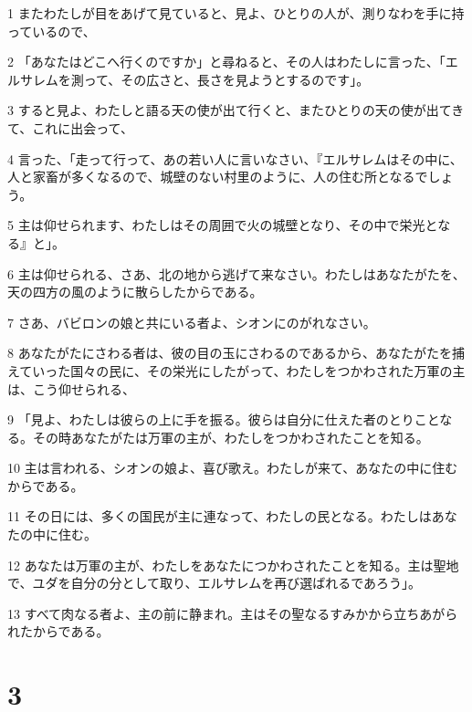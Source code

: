 \par 1 またわたしが目をあげて見ていると、見よ、ひとりの人が、測りなわを手に持っているので、
\par 2 「あなたはどこへ行くのですか」と尋ねると、その人はわたしに言った、「エルサレムを測って、その広さと、長さを見ようとするのです」。
\par 3 すると見よ、わたしと語る天の使が出て行くと、またひとりの天の使が出てきて、これに出会って、
\par 4 言った、「走って行って、あの若い人に言いなさい、『エルサレムはその中に、人と家畜が多くなるので、城壁のない村里のように、人の住む所となるでしょう。
\par 5 主は仰せられます、わたしはその周囲で火の城壁となり、その中で栄光となる』と」。
\par 6 主は仰せられる、さあ、北の地から逃げて来なさい。わたしはあなたがたを、天の四方の風のように散らしたからである。
\par 7 さあ、バビロンの娘と共にいる者よ、シオンにのがれなさい。
\par 8 あなたがたにさわる者は、彼の目の玉にさわるのであるから、あなたがたを捕えていった国々の民に、その栄光にしたがって、わたしをつかわされた万軍の主は、こう仰せられる、
\par 9 「見よ、わたしは彼らの上に手を振る。彼らは自分に仕えた者のとりことなる。その時あなたがたは万軍の主が、わたしをつかわされたことを知る。
\par 10 主は言われる、シオンの娘よ、喜び歌え。わたしが来て、あなたの中に住むからである。
\par 11 その日には、多くの国民が主に連なって、わたしの民となる。わたしはあなたの中に住む。
\par 12 あなたは万軍の主が、わたしをあなたにつかわされたことを知る。主は聖地で、ユダを自分の分として取り、エルサレムを再び選ばれるであろう」。
\par 13 すべて肉なる者よ、主の前に静まれ。主はその聖なるすみかから立ちあがられたからである。

\chapter{3}

